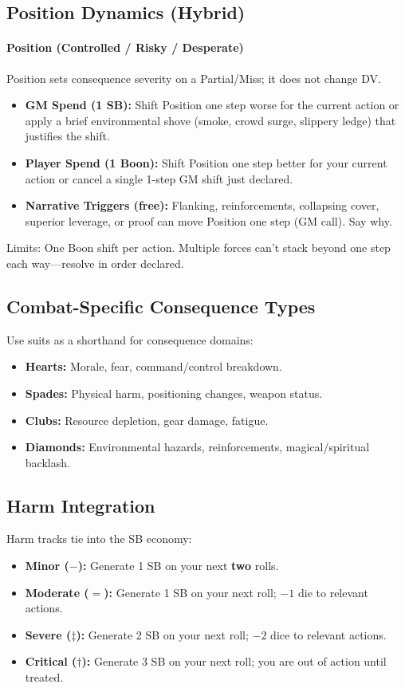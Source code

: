 \subsection{Position Dynamics (Hybrid)}
\paragraph{Position (Controlled / Risky / Desperate)}
Position sets consequence severity on a Partial/Miss; it does not change DV.
\begin{itemize}
  \item \textbf{GM Spend (1 SB):} Shift Position one step worse for the current action or apply a brief environmental shove (smoke, crowd surge, slippery ledge) that justifies the shift.
  \item \textbf{Player Spend (1 Boon):} Shift Position one step better for your current action or cancel a single 1-step GM shift just declared.
  \item \textbf{Narrative Triggers (free):} Flanking, reinforcements, collapsing cover, superior leverage, or proof can move Position one step (GM call). Say why.
\end{itemize}
Limits: One Boon shift per action. Multiple forces can’t stack beyond one step each way—resolve in order declared.

\subsection{Combat-Specific Consequence Types}
Use suits as a shorthand for consequence domains:
\begin{itemize}
  \item \textbf{Hearts:} Morale, fear, command/control breakdown.
  \item \textbf{Spades:} Physical harm, positioning changes, weapon status.
  \item \textbf{Clubs:} Resource depletion, gear damage, fatigue.
  \item \textbf{Diamonds:} Environmental hazards, reinforcements, magical/spiritual backlash.
\end{itemize}

\subsection{Harm Integration}
Harm tracks tie into the SB economy:
\begin{itemize}
  \item \textbf{Minor ($-$):} Generate 1 SB on your next \textbf{two} rolls.
  \item \textbf{Moderate ($=$):} Generate 1 SB on your next roll; $-1$ die to relevant actions.
  \item \textbf{Severe ($\ddagger$):} Generate 2 SB on your next roll; $-2$ dice to relevant actions.
  \item \textbf{Critical ($\dagger$):} Generate 3 SB on your next roll; you are out of action until treated.
\end{itemize}

